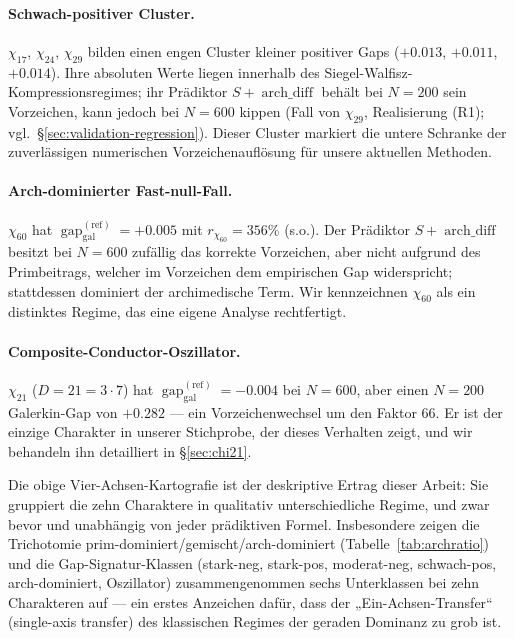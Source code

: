 \documentclass[a4paper,10pt,twocolumn]{article}
\theoremstyle{definition}
\theoremstyle{remark}
\newcommand{\gap}{\operatorname{gap}}
\newcommand{\chifn}{\chi}
\newcommand{\archdiff}{\operatorname{arch\_diff}}
\begin{document}
\paragraph{Schwach-positiver Cluster.}
$\chifn_{17}$, $\chifn_{24}$, $\chifn_{29}$ bilden einen engen Cluster
kleiner positiver Gaps ($+0.013$, $+0.011$, $+0.014$). Ihre absoluten
Werte liegen innerhalb des Siegel-Walfisz-Kompressionsregimes; ihr
Prädiktor $S+\archdiff$ behält bei $N=200$ sein Vorzeichen, kann jedoch bei
$N=600$ kippen (Fall von $\chifn_{29}$, Realisierung (R1); vgl.\
\S\ref{sec:validation-regression}). Dieser Cluster markiert die untere
Schranke der zuverlässigen numerischen Vorzeichenauflösung für unsere aktuellen
Methoden.

\paragraph{Arch-dominierter Fast-null-Fall.}
$\chifn_{60}$ hat $\gap_{\mathrm{gal}}^{(\mathrm{ref})}=+0.005$ mit
$r_{\chifn_{60}}=356\%$ (s.o.). Der Prädiktor $S+\archdiff$ besitzt bei $N=600$ zufällig
das korrekte Vorzeichen, aber nicht aufgrund
des Primbeitrags, welcher im Vorzeichen dem empirischen
Gap widerspricht; stattdessen dominiert der archimedische Term. Wir kennzeichnen $\chifn_{60}$
als ein distinktes Regime, das eine eigene Analyse rechtfertigt.

\paragraph{Composite-Conductor-Oszillator.}
$\chifn_{21}$ ($D=21=3\cdot 7$) hat $\gap_{\mathrm{gal}}^{(\mathrm{ref})}=-0.004$ bei
$N=600$, aber einen $N=200$ Galerkin-Gap von $+0.282$ --- ein Vorzeichenwechsel
um den Faktor $66$. Er ist der einzige Charakter in unserer Stichprobe, der dieses
Verhalten zeigt, und wir behandeln ihn detailliert in \S\ref{sec:chi21}.

\smallskip

Die obige Vier-Achsen-Kartografie ist der deskriptive Ertrag dieser Arbeit:
Sie gruppiert die zehn Charaktere in qualitativ unterschiedliche Regime, und
zwar bevor und unabhängig von jeder prädiktiven Formel. Insbesondere
zeigen die Trichotomie prim-dominiert/gemischt/arch-dominiert
(Tabelle~\ref{tab:archratio}) und die Gap-Signatur-Klassen
(stark-neg, stark-pos, moderat-neg, schwach-pos, arch-dominiert,
Oszillator) zusammengenommen sechs Unterklassen bei zehn Charakteren auf --- ein
erstes Anzeichen dafür, dass der „Ein-Achsen-Transfer“ (single-axis transfer) des klassischen
Regimes der geraden Dominanz \cite{RH_II} zu grob ist.
\end{document}
